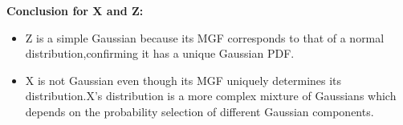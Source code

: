 \documentclass[12pt]{article}
\begin{document}
\begin{enumerate}
\textbf{Conclusion for X and Z:}
\\
\begin{itemize}
    \item Z is a simple Gaussian because its MGF corresponds to that of a normal distribution,confirming it has a unique Gaussian PDF.
    \item X is not Gaussian even though its MGF uniquely determines its distribution.X's distribution is a more complex mixture of Gaussians which depends on the probability selection of different Gaussian components.
\end{itemize}
\end{enumerate}
\end{document}
